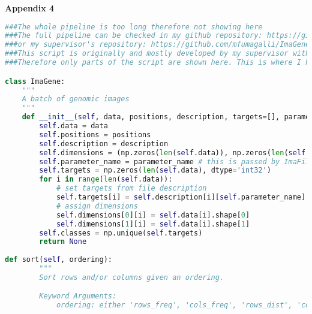 \cleardoublepage\clearpage
\large \vspace{1cm}
{\bf Appendix 4} 
\small 

\begin{lstlisting}[language=Python, breaklines]
###The whole pipeline is too long therefore not showing here
###The full pipeline can be checked in my github repository: https://github.com/kissesyun/CMEECoursework/tree/master/MResProject
###or my supervisor's repository: https://github.com/mfumagalli/ImaGene
###This script is originally and mostly developed by my supervisor with minor contribution from me. I have also modified some section to give better result
###Therefore only parts of the script are shown here. This is where I had addition and modification

class ImaGene:
    """
    A batch of genomic images
    """
    def __init__(self, data, positions, description, targets=[], parameter_name=None, classes=[]):
        self.data = data
        self.positions = positions
        self.description = description
        self.dimensions = (np.zeros(len(self.data)), np.zeros(len(self.data)))
        self.parameter_name = parameter_name # this is passed by ImaFile.read_simulations()
        self.targets = np.zeros(len(self.data), dtype='int32')
        for i in range(len(self.data)):
            # set targets from file description
            self.targets[i] = self.description[i][self.parameter_name]
            # assign dimensions
            self.dimensions[0][i] = self.data[i].shape[0]
            self.dimensions[1][i] = self.data[i].shape[1]
        self.classes = np.unique(self.targets)
        return None
        
def sort(self, ordering):
        """
        Sort rows and/or columns given an ordering.

        Keyword Arguments:
            ordering: either 'rows_freq', 'cols_freq', 'rows_dist', 'cols_dist'


\end{lstlisting}

